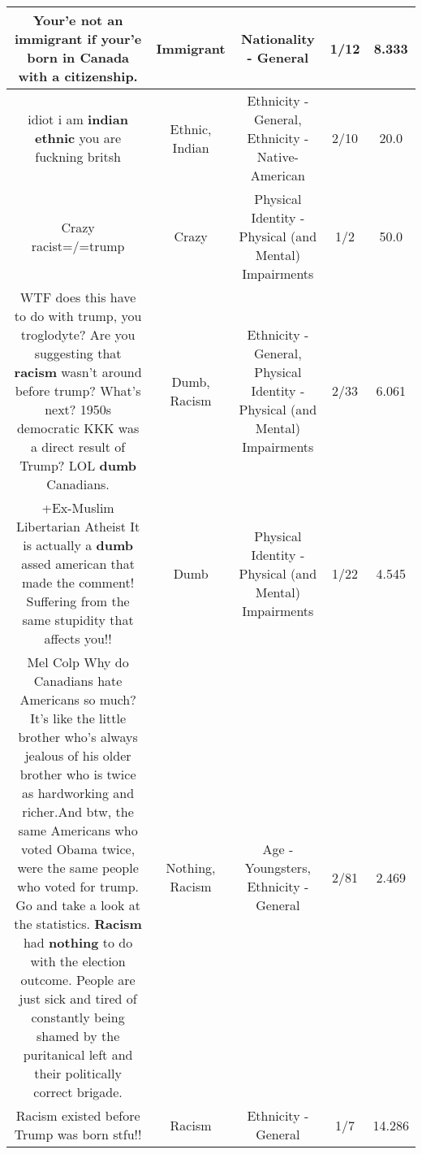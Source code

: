 \documentclass[11pt]{article}
\newlength\mylength
\begin{document}
\begin{center}
\begin{longtable}{|C{.65\mylength}|C{.30\mylength}|C{.12\mylength}|C{.12\mylength}|C{.12\mylength}|}
  \small Your'e not an \textbf{immigrant} if your'e born in Canada with a citizenship.\normalsize   & Immigrant & Nationality - General & 1/12 & 8.333 \\  \hline
  \small {} idiot  i am \textbf{indian} \textbf{ethnic} you are fuckning britsh\normalsize   & Ethnic, Indian & Ethnicity - General, Ethnicity - Native-American & 2/10 & 20.0 \\  \hline
  \small Crazy racist=/=trump\normalsize   & Crazy & Physical Identity - Physical (and Mental) Impairments & 1/2 & 50.0 \\  \hline
  \small WTF does this have to do with trump, you troglodyte? Are you suggesting that \textbf{racism} wasn't around before trump? What's next? 1950s democratic KKK was a direct result of Trump? LOL \textbf{dumb} Canadians.\normalsize   & Dumb, Racism & Ethnicity - General, Physical Identity - Physical (and Mental) Impairments & 2/33 & 6.061 \\  \hline
  \small +Ex-Muslim Libertarian Atheist It is actually a \textbf{dumb} assed american that made the comment! Suffering from the same stupidity that affects you!!\normalsize   & Dumb & Physical Identity - Physical (and Mental) Impairments & 1/22 & 4.545 \\  \hline
  \small Mel Colp Why do Canadians hate Americans so much? It's like the little brother who's always jealous of his older brother who is twice as hardworking and richer.And btw, the same Americans who voted Obama twice, were the same people who voted for trump. Go and take a look at the statistics. \textbf{Racism} had \textbf{nothing} to do with the election outcome. People are just sick and tired of constantly being shamed by the puritanical left and their politically correct brigade.\normalsize   & Nothing, Racism & Age - Youngsters, Ethnicity - General & 2/81 & 2.469 \\  \hline
  \small Racism existed before Trump was born stfu!!\normalsize   & Racism & Ethnicity - General & 1/7 & 14.286 \\  \hline

\end{longtable}
\end{center}
\end{document}
